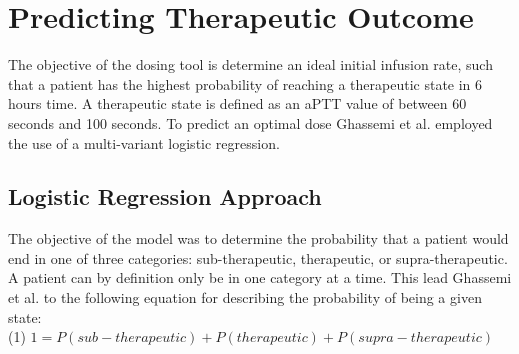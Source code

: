 \documentclass[12pt,a4paper,]{report}
\begin{document}
\section{Predicting Therapeutic
Outcome}\label{predicting-therapeutic-outcome}

The objective of the dosing tool is determine an ideal initial infusion
rate, such that a patient has the highest probability of reaching a
therapeutic state in 6 hours time. A therapeutic state is defined as an
aPTT value of between 60 seconds and 100 seconds. To predict an optimal
dose Ghassemi et al. employed the use of a multi-variant logistic
regression.

\subsection{Logistic Regression
Approach}\label{logistic-regression-approach}

The objective of the model was to determine the probability that a
patient would end in one of three categories: sub-therapeutic,
therapeutic, or supra-therapeutic. A patient can by definition only be
in one category at a time. This lead Ghassemi et al. to the following
equation for describing the probability of being a given state:\\
(1) \(1 = P(sub-therapeutic) + P(therapeutic) + P(supra-therapeutic)\)
\end{document}
